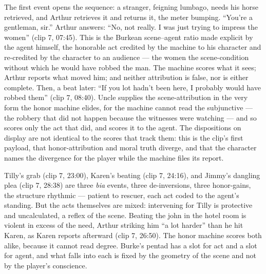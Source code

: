 The first event opens the sequence: a stranger, feigning lumbago, needs his horse retrieved, and Arthur retrieves it and returns it, the meter bumping. ``You're a gentleman, sir.'' Arthur answers: ``No, not really. I was just trying to impress the women'' (clip 7, 07:45). This is the Burkean scene–agent ratio made explicit by the agent himself, the honorable act credited by the machine to his character and re-credited by the character to an audience — the women the scene-condition without which he would have robbed the man. The machine scores what it sees; Arthur reports what moved him; and neither attribution is false, nor is either complete. Then, a beat later: ``If you lot hadn't been here, I probably would have robbed them'' (clip 7, 08:40). Uncle supplies the scene-attribution in the very form the honor machine elides, for the machine cannot read the subjunctive — the robbery that did not happen because the witnesses were watching — and so scores only the act that did, and scores it to the agent. The dispositions on display are not identical to the scores that track them: this is the clip's first payload, that honor-attribution and moral truth diverge, and that the character names the divergence for the player while the machine files its report.

Tilly's grab (clip 7, 23:00), Karen's beating (clip 7, 24:16), and Jimmy's dangling plea (clip 7, 28:38) are three \textit{bia} events, three de-inversions, three honor-gains, the structure rhythmic — patient to rescuer, each act coded to the agent's standing. But the acts themselves are mixed: intervening for Tilly is protective and uncalculated, a reflex of the scene. Beating the john in the hotel room is violent in excess of the need, Arthur striking him ``a lot harder'' than he hit Karen, as Karen reports afterward (clip 7, 26:50). The honor machine scores both alike, because it cannot read degree. Burke's pentad has a slot for act and a slot for agent, and what falls into each is fixed by the geometry of the scene and not by the player's conscience.


